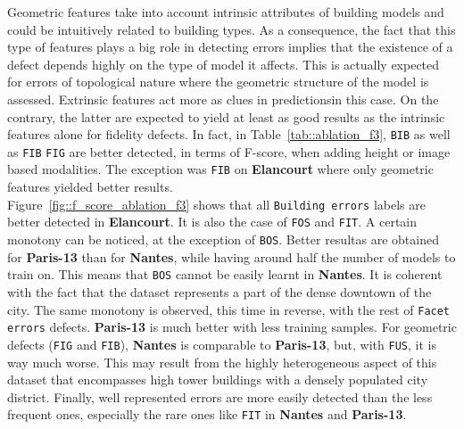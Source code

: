         Geometric features take into account intrinsic attributes of building models and could be intuitively related to building types.
        As a consequence, the fact that this type of features plays a big role in detecting errors implies that the existence of a defect depends highly on the type of model it affects.
        This is actually expected for errors of topological nature where the geometric structure of the model is assessed.
        Extrinsic features act more as clues in predictionsin this case.
        On the contrary, the latter are expected to yield at least as good results as the intrinsic features alone for fidelity defects.
        In fact, in Table~\ref{tab::ablation_f3}, \texttt{BIB} as well as \texttt{FIB} \texttt{FIG} are better detected, in terms of F-score, when adding height or image based modalities.
        The exception was \texttt{FIB} on \textbf{Elancourt} where only geometric features yielded better results.\\

        Figure~\ref{fig::f_score_ablation_f3} shows that all \texttt{Building errors} labels are better detected in \textbf{Elancourt}.
        It is also the case of \texttt{FOS} and \texttt{FIT}.
        A certain monotony can be noticed, at the exception of \texttt{BOS}.
        Better resultas are obtained for \textbf{Paris-13} than for \textbf{Nantes}, while having around half the number of models to train on.
        This means that \texttt{BOS} cannot be easily learnt in \textbf{Nantes}.
        It is coherent with the fact that the dataset represents a part of the dense downtown of the city.
        The same monotony is observed, this time in reverse, with the rest of \texttt{Facet errors} defects. \textbf{Paris-13} is much better with less training samples.
        For geometric defects (\texttt{FIG} and \texttt{FIB}), \textbf{Nantes} is comparable to \textbf{Paris-13}, but, with \texttt{FUS}, it is way much worse.
        This may result from the highly heterogeneous aspect of this dataset that encompasses high tower buildings with a densely populated city district.
        Finally, well represented errors are more easily detected than the less frequent ones, especially the rare ones like \texttt{FIT} in \textbf{Nantes} and \textbf{Paris-13}.
        
